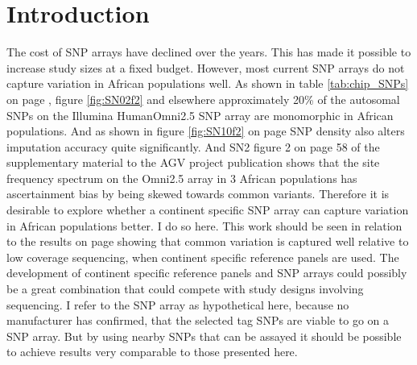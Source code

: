 \section{Introduction}
\label{sec:introduction_chip}

The cost of \gls{SNP} arrays have declined over the years. This has made it possible to increase study sizes at a fixed budget. However, most current \gls{SNP} arrays do not capture variation in African populations well. As shown in table \ref{tab:chip_SNPs} on page \pageref{tab:chip_SNPs}, figure \ref{fig:SN02f2} and elsewhere\cite{Gurdasani2015} approximately 20\% of the autosomal SNPs on the Illumina HumanOmni2.5 SNP array are monomorphic in African populations. And as shown in figure \ref{fig:SN10f2} on page \pageref{fig:SN10f2} \gls{SNP} density also alters imputation accuracy quite significantly. And SN2 figure 2 on page 58 of the supplementary material to the AGV project publication\cite{Gurdasani2015} shows that the site frequency spectrum on the Omni2.5 array in 3 African populations has ascertainment bias by being skewed towards common variants. Therefore it is desirable to explore whether a continent specific \gls{SNP} array can capture variation in African populations better. I do so here. This work should be seen in relation to the results on page \pageref{sec:rp_results} showing that common variation is captured well relative to low coverage sequencing, when continent specific reference panels are used. The development of continent specific reference panels and \gls{SNP} arrays could possibly be a great combination that could compete with study designs involving sequencing. I refer to the \gls{SNP} array as hypothetical here, because no manufacturer has confirmed, that the selected tag \glspl{SNP} are viable to go on a \gls{SNP} array. But by using nearby \glspl{SNP} that can be assayed it should be possible to achieve results very comparable to those presented here.


